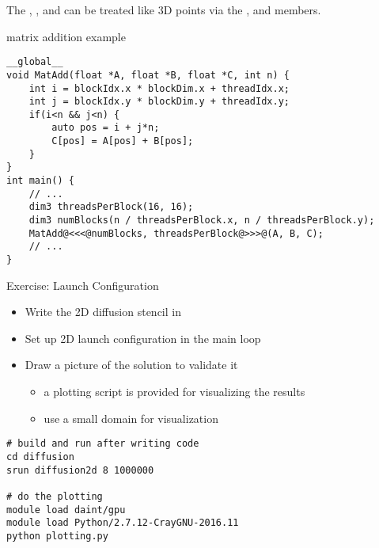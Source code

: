 \documentclass[aspectratio=43]{beamer}
\begin{document}
\begin{frame}[fragile]{}

    The , ,  and  can be treated like 3D points via the ,  and  members.
    \begin{code}{matrix addition example}
        \begin{lstlisting}[style=boxcudatiny]
__global__
void MatAdd(float *A, float *B, float *C, int n) {
    int i = blockIdx.x * blockDim.x + threadIdx.x;
    int j = blockIdx.y * blockDim.y + threadIdx.y;
    if(i<n && j<n) {
        auto pos = i + j*n;
        C[pos] = A[pos] + B[pos];
    }
}
int main() {
    // ...
    dim3 threadsPerBlock(16, 16);
    dim3 numBlocks(n / threadsPerBlock.x, n / threadsPerBlock.y);
    MatAdd@<<<@numBlocks, threadsPerBlock@>>>@(A, B, C);
    // ...
}
        \end{lstlisting}
   \end{code}

\end{frame}

\begin{frame}[fragile]{Exercise: Launch Configuration}
    \begin{itemize}
        \item Write the 2D diffusion stencil in 
        \item Set up 2D launch configuration in the main loop
        \item Draw a picture of the solution to validate it
        \begin{itemize}
            \item a plotting script is provided for visualizing the results
            \item use a small domain for visualization
        \end{itemize}
    \end{itemize}

    \begin{terminal}{}
        \begin{lstlisting}[style=terminal]
# build and run after writing code
cd diffusion
srun diffusion2d 8 1000000

# do the plotting
module load daint/gpu
module load Python/2.7.12-CrayGNU-2016.11
python plotting.py
        \end{lstlisting}
    \end{terminal}
\end{frame}
\end{document}
